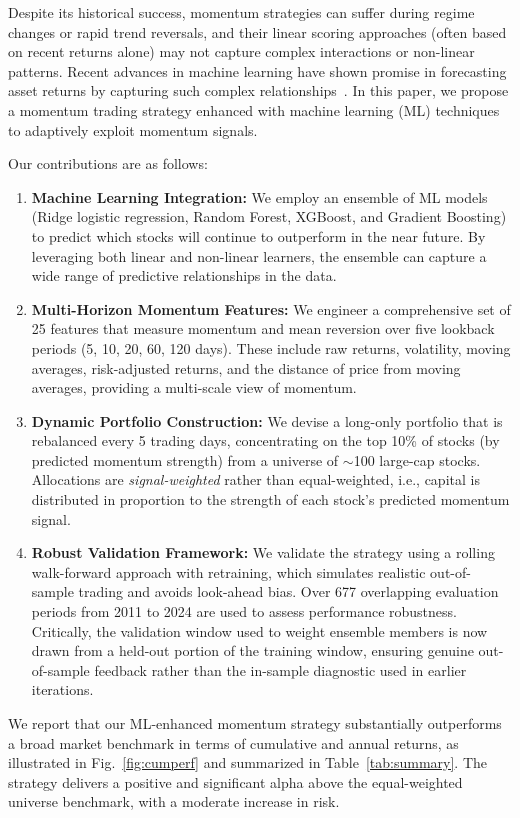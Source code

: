 \documentclass[conference]{IEEEtran}
\begin{document}
Despite its historical success, momentum strategies can suffer during regime changes or rapid trend reversals, and their linear scoring approaches (often based on recent returns alone) may not capture complex interactions or non-linear patterns. Recent advances in machine learning have shown promise in forecasting asset returns by capturing such complex relationships~\cite{gu2020}. In this paper, we propose a momentum trading strategy enhanced with machine learning (ML) techniques to adaptively exploit momentum signals.

Our contributions are as follows:
\begin{enumerate}
    \item \textbf{Machine Learning Integration:} We employ an ensemble of ML models (Ridge logistic regression, Random Forest, XGBoost, and Gradient Boosting) to predict which stocks will continue to outperform in the near future. By leveraging both linear and non-linear learners, the ensemble can capture a wide range of predictive relationships in the data.
    \item \textbf{Multi-Horizon Momentum Features:} We engineer a comprehensive set of 25 features that measure momentum and mean reversion over five lookback periods (5, 10, 20, 60, 120 days). These include raw returns, volatility, moving averages, risk-adjusted returns, and the distance of price from moving averages, providing a multi-scale view of momentum.
    \item \textbf{Dynamic Portfolio Construction:} We devise a long-only portfolio that is rebalanced every 5 trading days, concentrating on the top 10\% of stocks (by predicted momentum strength) from a universe of $\sim$100 large-cap stocks. Allocations are \emph{signal-weighted} rather than equal-weighted, i.e., capital is distributed in proportion to the strength of each stock's predicted momentum signal.
    \item \textbf{Robust Validation Framework:} We validate the strategy using a rolling walk-forward approach with retraining, which simulates realistic out-of-sample trading and avoids look-ahead bias. Over 677 overlapping evaluation periods from 2011 to 2024 are used to assess performance robustness. Critically, the validation window used to weight ensemble members is now drawn from a held-out portion of the training window, ensuring genuine out-of-sample feedback rather than the in-sample diagnostic used in earlier iterations.
\end{enumerate}

We report that our ML-enhanced momentum strategy substantially outperforms a broad market benchmark in terms of cumulative and annual returns, as illustrated in Fig.~\ref{fig:cumperf} and summarized in Table~\ref{tab:summary}. The strategy delivers a positive and significant alpha above the equal-weighted universe benchmark, with a moderate increase in risk.
\end{document}
